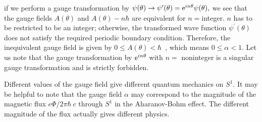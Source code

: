 \documentclass[a4paper,12pt]{article}
\begin{document}
if we perform a gauge transformation by
$
\psi(\theta)\rightarrow \psi^{\prime}(\theta)={\rm e}^{in\theta}\psi(\theta),
$
we see that the gauge fields $A(\theta)$ and $A(\theta)-n\hbar$ 
are equivalent for $n=$integer. $n$ has to be restricted to be 
an integer; otherwise, the transformed wave 
function $\psi^{\prime}(\theta)$ does not satisfy 
the required periodic boundary condition. 
Therefore, the inequivalent gauge field 
is given by $0\leq A(\theta) < \hbar$~, which means $0\leq \alpha <1$. 
Let us note that the gauge transformation by ${\rm e}^{in\theta}$ with
$n=$ noninteger is a singular gauge transformation and is strictly
forbidden. 
\par
Different values of the gauge field give different 
quantum mechanics on $S^1$. It may be helpful to note that the 
gauge field $\alpha$ may correspond to   
the magnitude of the magnetic flux $e\Phi/2\pi \hbar~c$ through $S^1$ in 
the Aharanov-Bohm effect. The different magnitude of the flux 
actually gives different physics.   
\par
\end{document}
